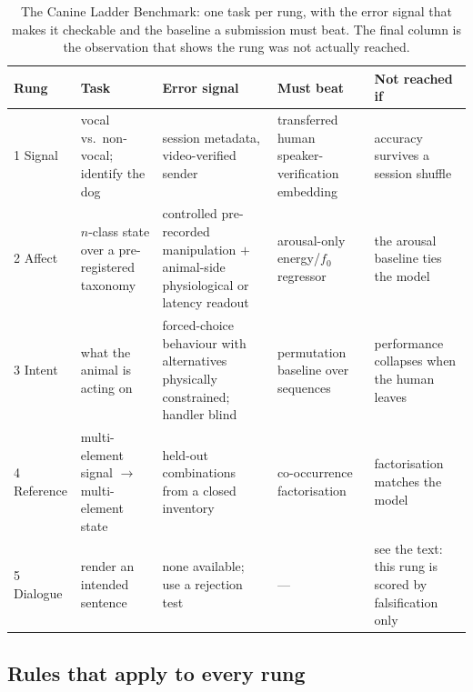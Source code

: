 \begin{table}[htbp]
\centering
\caption{The Canine Ladder Benchmark: one task per rung, with the error signal
that makes it checkable and the baseline a submission must beat. The final
column is the observation that shows the rung was not actually reached.}
\label{tab:protocol}
\footnotesize
\setlength{\tabcolsep}{4pt}
\begin{tabular}{@{}p{1.5cm}p{3.1cm}p{3.5cm}p{3.4cm}p{3.4cm}@{}}
\toprule
\textbf{Rung} & \textbf{Task} & \textbf{Error signal} & \textbf{Must beat} & \textbf{Not reached if} \\
\midrule
1 Signal & vocal vs.\ non-vocal; identify the dog & session metadata, video-verified sender & transferred human speaker-verification embedding & accuracy survives a session shuffle \\
2 Affect & $n$-class state over a pre-registered taxonomy & controlled pre-recorded manipulation $+$ animal-side physiological or latency readout & arousal-only energy/$f_0$ regressor & the arousal baseline ties the model \\
3 Intent & what the animal is acting on & forced-choice behaviour with alternatives physically constrained; handler blind & permutation baseline over sequences & performance collapses when the human leaves \\
4 Reference & multi-element signal $\rightarrow$ multi-element state & held-out combinations from a closed inventory & co-occurrence factorisation & factorisation matches the model \\
5 Dialogue & render an intended sentence & none available; use a rejection test & --- & see the text: this rung is scored by falsification only \\
\bottomrule
\end{tabular}
\end{table}

\subsection{Rules that apply to every rung}

